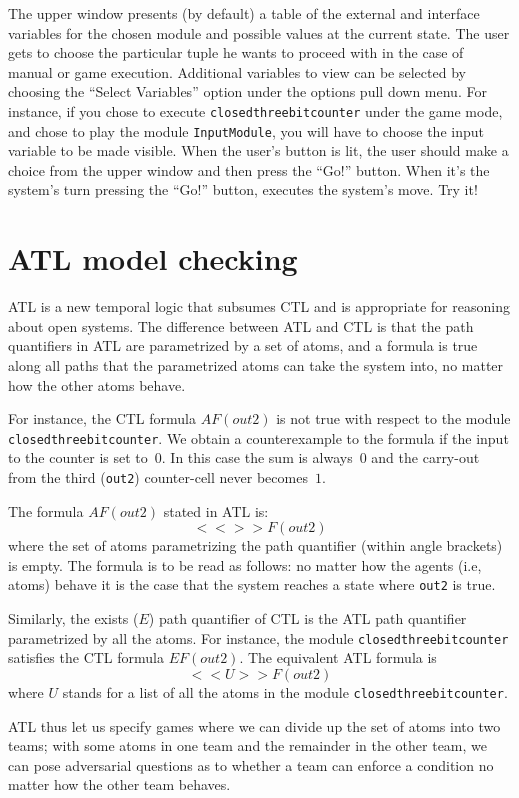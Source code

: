 The upper window presents (by default) a table of the external and interface
variables for the chosen module and possible values at the current
state. The user gets to choose the particular tuple he wants to
proceed with in the case of manual or game execution.  Additional
variables to view can be selected by choosing the ``Select Variables''
option under the options pull down menu. For instance, if you chose to
execute {\tt closedthreebitcounter} under the game mode, and chose to
play the module {\tt InputModule}, you will have to choose the
input variable to be made visible. When the user's button is lit, the
user should make a choice from the upper window and then press the
``Go!'' button. When it's the system's turn pressing the ``Go!''
button, executes the system's move. Try it!

\section{ATL model checking}

ATL is a new temporal logic that subsumes CTL and is appropriate for
reasoning about open systems. The difference between ATL and CTL is
that the path quantifiers in ATL are parametrized by a set of atoms,
and a formula is true along all paths that the parametrized atoms can
take the system into, no matter how the other atoms behave. 

For instance, the CTL formula $A F (out2)$ is not true with respect to
the module {\tt closedthreebitcounter}.
We obtain a counterexample to the formula if the input to the counter is set to~$0$.
In this case the sum is always~$0$ and the carry-out from the third ({\tt out2})
counter-cell never becomes~$1$.

The formula $A F (out2)$ stated in ATL is: $$<< >> F (out2) $$ where the set
of atoms parametrizing the path quantifier (within angle brackets) is
empty. The formula is to be read as follows: no matter how the agents
(i.e, atoms) behave it is the case that the system reaches a state
where {\tt out2} is true.

Similarly, the exists ($E$) path quantifier of CTL is the ATL path
quantifier parametrized by all the atoms. For instance, the module
{\tt closedthreebitcounter} satisfies the CTL formula $E F (out2)$.
The equivalent ATL formula is $$<< U >> F (out2)$$ where $U$
stands for a list of all the atoms in the module {\tt closedthreebitcounter}. 

ATL thus let us specify games where we can divide up the set of
atoms into two teams; with some atoms in one team and the remainder in the
other team, we can pose adversarial questions as to whether a team
can enforce a condition no matter how the other team behaves.


